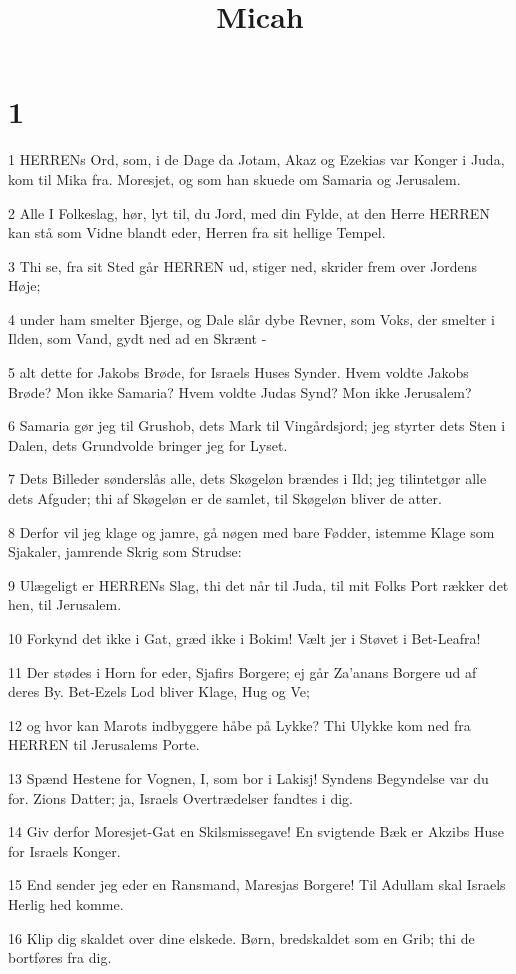 

\title{Micah}


\chapter{1}

\par 1 HERRENs Ord, som, i de Dage da Jotam, Akaz og Ezekias var Konger i Juda, kom til Mika fra. Moresjet, og som han skuede om Samaria og Jerusalem.
\par 2 Alle I Folkeslag, hør, lyt til, du Jord, med din Fylde, at den Herre HERREN kan stå som Vidne blandt eder, Herren fra sit hellige Tempel.
\par 3 Thi se, fra sit Sted går HERREN ud, stiger ned, skrider frem over Jordens Høje;
\par 4 under ham smelter Bjerge, og Dale slår dybe Revner, som Voks, der smelter i Ilden, som Vand, gydt ned ad en Skrænt -
\par 5 alt dette for Jakobs Brøde, for Israels Huses Synder. Hvem voldte Jakobs Brøde? Mon ikke Samaria? Hvem voldte Judas Synd? Mon ikke Jerusalem?
\par 6 Samaria gør jeg til Grushob, dets Mark til Vingårdsjord; jeg styrter dets Sten i Dalen, dets Grundvolde bringer jeg for Lyset.
\par 7 Dets Billeder sønderslås alle, dets Skøgeløn brændes i Ild; jeg tilintetgør alle dets Afguder; thi af Skøgeløn er de samlet, til Skøgeløn bliver de atter.
\par 8 Derfor vil jeg klage og jamre, gå nøgen med bare Fødder, istemme Klage som Sjakaler, jamrende Skrig som Strudse:
\par 9 Ulægeligt er HERRENs Slag, thi det når til Juda, til mit Folks Port rækker det hen, til Jerusalem.
\par 10 Forkynd det ikke i Gat, græd ikke i Bokim! Vælt jer i Støvet i Bet-Leafra!
\par 11 Der stødes i Horn for eder, Sjafirs Borgere; ej går Za'anans Borgere ud af deres By. Bet-Ezels Lod bliver Klage, Hug og Ve;
\par 12 og hvor kan Marots indbyggere håbe på Lykke? Thi Ulykke kom ned fra HERREN til Jerusalems Porte.
\par 13 Spænd Hestene for Vognen, I, som bor i Lakisj! Syndens Begyndelse var du for. Zions Datter; ja, Israels Overtrædelser fandtes i dig.
\par 14 Giv derfor Moresjet-Gat en Skilsmissegave! En svigtende Bæk er Akzibs Huse for Israels Konger.
\par 15 End sender jeg eder en Ransmand, Maresjas Borgere! Til Adullam skal Israels Herlig hed komme.
\par 16 Klip dig skaldet over dine elskede. Børn, bredskaldet som en Grib; thi de bortføres fra dig.

